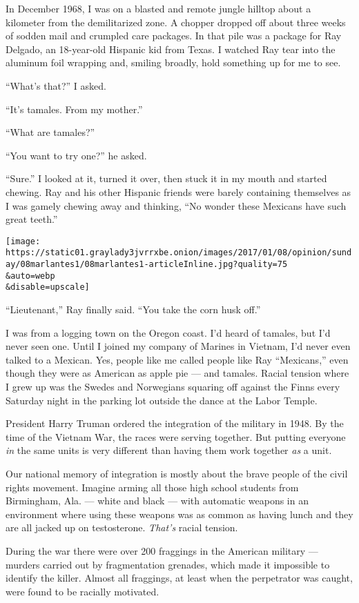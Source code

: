 In December 1968, I was on a blasted and remote jungle hilltop about a
kilometer from the demilitarized zone. A chopper dropped off about three
weeks of sodden mail and crumpled care packages. In that pile was a
package for Ray Delgado, an 18-year-old Hispanic kid from Texas. I
watched Ray tear into the aluminum foil wrapping and, smiling broadly,
hold something up for me to see.

``What's that?'' I asked.

``It's tamales. From my mother.''

``What are tamales?''

``You want to try one?'' he asked.

``Sure.'' I looked at it, turned it over, then stuck it in my mouth and
started chewing. Ray and his other Hispanic friends were barely
containing themselves as I was gamely chewing away and thinking, ``No
wonder these Mexicans have such great teeth.''

\texttt{[image: https://static01.graylady3jvrrxbe.onion/images/2017/01/08/opinion/sunday/08marlantes1/08marlantes1-articleInline.jpg?quality=75\\\&auto=webp\\\&disable=upscale]}

``Lieutenant,'' Ray finally said. ``You take the corn husk off.''

I was from a logging town on the Oregon coast. I'd heard of tamales, but
I'd never seen one. Until I joined my company of Marines in Vietnam, I'd
never even talked to a Mexican. Yes, people like me called people like
Ray ``Mexicans,'' even though they were as American as apple pie --- and
tamales. Racial tension where I grew up was the Swedes and Norwegians
squaring off against the Finns every Saturday night in the parking lot
outside the dance at the Labor Temple.

President Harry Truman ordered the integration of the military in 1948.
By the time of the Vietnam War, the races were serving together. But
putting everyone \emph{in} the same units is very different than having
them work together \emph{as} a unit.

Our national memory of integration is mostly about the brave people of
the civil rights movement. Imagine arming all those high school students
from Birmingham, Ala. --- white and black --- with automatic weapons in
an environment where using these weapons was as common as having lunch
and they are all jacked up on testosterone. \emph{That's} racial
tension.

During the war there were over 200 fraggings in the American military
--- murders carried out by fragmentation grenades, which made it
impossible to identify the killer. Almost all fraggings, at least when
the perpetrator was caught, were found to be racially motivated.

